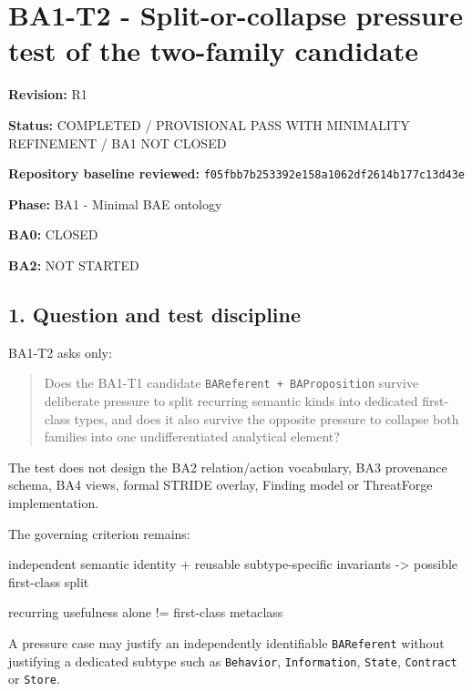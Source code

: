 \documentclass[
  10pt,
]{article}
\author{}
\date{}
\newenvironment{Shaded}{}{}
\newcommand{\NormalTok}[1]{#1}
\begin{document}
\section{BA1-T2 - Split-or-collapse pressure test of the two-family
candidate}\label{ba1-t2---split-or-collapse-pressure-test-of-the-two-family-candidate}

\textbf{Revision:} R1

\textbf{Status:} COMPLETED / PROVISIONAL PASS WITH MINIMALITY REFINEMENT
/ BA1 NOT CLOSED

\textbf{Repository baseline reviewed:}
\texttt{f05fbb7b253392e158a1062df2614b177c13d43e}

\textbf{Phase:} BA1 - Minimal BAE ontology

\textbf{BA0:} CLOSED

\textbf{BA2:} NOT STARTED

\subsection{1. Question and test
discipline}\label{question-and-test-discipline}

BA1-T2 asks only:

\begin{quote}
Does the BA1-T1 candidate \texttt{BAReferent\ +\ BAProposition} survive
deliberate pressure to split recurring semantic kinds into dedicated
first-class types, and does it also survive the opposite pressure to
collapse both families into one undifferentiated analytical element?
\end{quote}

The test does not design the BA2 relation/action vocabulary, BA3
provenance schema, BA4 views, formal STRIDE overlay, Finding model or
ThreatForge implementation.

The governing criterion remains:

\begin{Shaded}
\begin{Highlighting}[]
\NormalTok{independent semantic identity}
\NormalTok{        +}
\NormalTok{reusable subtype{-}specific invariants}
\NormalTok{        {-}\textgreater{} possible first{-}class split}

\NormalTok{recurring usefulness alone}
\NormalTok{        !=}
\NormalTok{first{-}class metaclass}
\end{Highlighting}
\end{Shaded}

A pressure case may justify an independently identifiable
\texttt{BAReferent} without justifying a dedicated subtype such as
\texttt{Behavior}, \texttt{Information}, \texttt{State},
\texttt{Contract} or \texttt{Store}.
\end{document}
